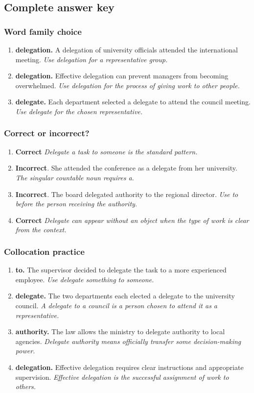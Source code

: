\documentclass[11pt]{article}
\begin{document}
\subsection{Complete answer key}
\subsubsection{Word family choice}
\begin{enumerate}
  \item \textbf{delegation.} A delegation of university officials attended the international meeting. \emph{Use delegation for a representative group.}
  \item \textbf{delegation.} Effective delegation can prevent managers from becoming overwhelmed. \emph{Use delegation for the process of giving work to other people.}
  \item \textbf{delegate.} Each department selected a delegate to attend the council meeting. \emph{Use delegate for the chosen representative.}
\end{enumerate}

\subsubsection{Correct or incorrect?}
\begin{enumerate}
  \item \textbf{Correct} \emph{Delegate a task to someone is the standard pattern.}
  \item \textbf{Incorrect}. She attended the conference as a delegate from her university. \emph{The singular countable noun requires a.}
  \item \textbf{Incorrect}. The board delegated authority to the regional director. \emph{Use to before the person receiving the authority.}
  \item \textbf{Correct} \emph{Delegate can appear without an object when the type of work is clear from the context.}
\end{enumerate}

\subsubsection{Collocation practice}
\begin{enumerate}
  \item \textbf{to.} The supervisor decided to delegate the task to a more experienced employee. \emph{Use delegate something to someone.}
  \item \textbf{delegate.} The two departments each elected a delegate to the university council. \emph{A delegate to a council is a person chosen to attend it as a representative.}
  \item \textbf{authority.} The law allows the ministry to delegate authority to local agencies. \emph{Delegate authority means officially transfer some decision-making power.}
  \item \textbf{delegation.} Effective delegation requires clear instructions and appropriate supervision. \emph{Effective delegation is the successful assignment of work to others.}
\end{enumerate}
\end{document}
